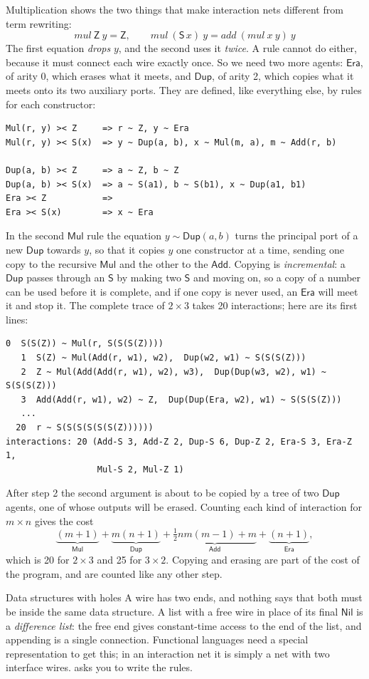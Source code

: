 \documentclass[11pt,a4paper]{article}
\newcommand{\ag}[1]{\mathsf{#1}}
\newcommand{\Z}{\ag{Z}}
\newcommand{\Sa}{\ag{S}}
\newcommand{\Add}{\ag{Add}}
\newcommand{\Mul}{\ag{Mul}}
\newcommand{\Dup}{\ag{Dup}}
\newcommand{\Era}{\ag{Era}}
\newcommand{\eqn}{\mathrel{\sim}}
\theoremstyle{definition}
\theoremstyle{plain}
\begin{document}
Multiplication shows the two things that make interaction nets different from
term rewriting:
\[
  \mathit{mul}\ \Z\ y = \Z, \qquad
  \mathit{mul}\ (\Sa\,x)\ y = \mathit{add}\ (\mathit{mul}\ x\ y)\ y
\]
The first equation \emph{drops} $y$, and the second uses it \emph{twice}. A
rule cannot do either, because it must connect each wire exactly once. So we
need two more agents: $\Era$, of arity 0, which erases what it meets, and
$\Dup$, of arity 2, which copies what it meets onto its two auxiliary ports.
They are defined, like everything else, by rules for each constructor:
\begin{lstlisting}
Mul(r, y) >< Z     => r ~ Z, y ~ Era
Mul(r, y) >< S(x)  => y ~ Dup(a, b), x ~ Mul(m, a), m ~ Add(r, b)

Dup(a, b) >< Z     => a ~ Z, b ~ Z
Dup(a, b) >< S(x)  => a ~ S(a1), b ~ S(b1), x ~ Dup(a1, b1)
Era >< Z           =>
Era >< S(x)        => x ~ Era
\end{lstlisting}
In the second $\Mul$ rule the equation $y \eqn \Dup(a,b)$ turns the principal
port of a new $\Dup$ towards $y$, so that it copies $y$ one constructor at a
time, sending one copy to the recursive $\Mul$ and the other to the $\Add$.
Copying is \emph{incremental}: a $\Dup$ passes through an $\Sa$ by making two
$\Sa$ and moving on, so a copy of a number can be used before it is complete,
and if one copy is never used, an $\Era$ will meet it and stop it. The
complete trace of $2\times 3$ takes 20 interactions; here are its first
lines:
\begin{lstlisting}[style=trace]
   0  S(S(Z)) ~ Mul(r, S(S(S(Z))))
   1  S(Z) ~ Mul(Add(r, w1), w2),  Dup(w2, w1) ~ S(S(S(Z)))
   2  Z ~ Mul(Add(Add(r, w1), w2), w3),  Dup(Dup(w3, w2), w1) ~ S(S(S(Z)))
   3  Add(Add(r, w1), w2) ~ Z,  Dup(Dup(Era, w2), w1) ~ S(S(S(Z)))
   ...
  20  r ~ S(S(S(S(S(S(Z))))))
interactions: 20 (Add-S 3, Add-Z 2, Dup-S 6, Dup-Z 2, Era-S 3, Era-Z 1,
                  Mul-S 2, Mul-Z 1)
\end{lstlisting}
After step 2 the second argument is about to be copied by a tree of two
$\Dup$ agents, one of whose outputs will be erased. Counting each kind of
interaction for $m \times n$ gives the cost
\[
  \underbrace{(m+1)}_{\Mul} + \underbrace{m(n+1)}_{\Dup}
  + \underbrace{\tfrac12 nm(m-1) + m}_{\Add} + \underbrace{(n+1)}_{\Era},
\]
which is 20 for $2\times 3$ and 25 for $3\times 2$. Copying and erasing are
part of the cost of the program, and are counted like any other step.

\begin{aside}{Data structures with holes}
A wire has two ends, and nothing says that both must be inside the same
data structure. A list with a free wire in place of its final $\ag{Nil}$ is a
\emph{difference list}: the free end gives constant-time access to the end
of the list, and appending is a single connection. Functional languages need
a special representation to get this; in an interaction net it is simply a
net with two interface wires.  asks you to write the rules.
\end{aside}
\end{document}
